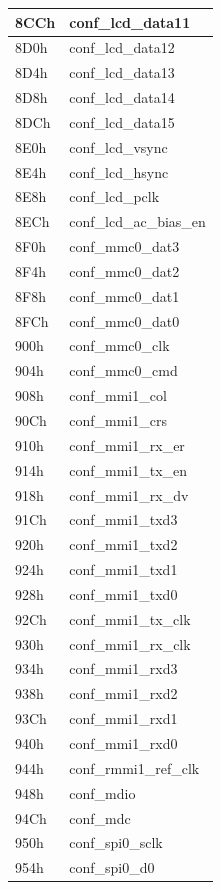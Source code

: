 \begin{longtable}{ | M{7.5cm} | M{7.5cm} |}
	8CCh & conf\_lcd\_data11 \\ \hline
	8D0h & conf\_lcd\_data12 \\ \hline
	8D4h & conf\_lcd\_data13 \\ \hline
	8D8h & conf\_lcd\_data14 \\ \hline
	8DCh & conf\_lcd\_data15 \\ \hline
	8E0h & conf\_lcd\_vsync \\ \hline
	8E4h & conf\_lcd\_hsync \\ \hline
	8E8h & conf\_lcd\_pclk \\ \hline
	8ECh & conf\_lcd\_ac\_bias\_en \\ \hline
	8F0h & conf\_mmc0\_dat3 \\ \hline
	8F4h & conf\_mmc0\_dat2 \\ \hline
	8F8h & conf\_mmc0\_dat1 \\ \hline
	8FCh & conf\_mmc0\_dat0 \\ \hline
	900h & conf\_mmc0\_clk \\ \hline
	904h & conf\_mmc0\_cmd \\ \hline
	908h & conf\_mmi1\_col \\ \hline
	90Ch & conf\_mmi1\_crs \\ \hline
	910h & conf\_mmi1\_rx\_er \\ \hline
	914h & conf\_mmi1\_tx\_en \\ \hline
	918h & conf\_mmi1\_rx\_dv \\ \hline
	91Ch & conf\_mmi1\_txd3 \\ \hline
	920h & conf\_mmi1\_txd2 \\ \hline
	924h & conf\_mmi1\_txd1 \\ \hline
	928h & conf\_mmi1\_txd0 \\ \hline
	92Ch & conf\_mmi1\_tx\_clk \\ \hline
	930h & conf\_mmi1\_rx\_clk \\ \hline
	934h & conf\_mmi1\_rxd3 \\ \hline
	938h & conf\_mmi1\_rxd2 \\ \hline
	93Ch & conf\_mmi1\_rxd1 \\ \hline
	940h & conf\_mmi1\_rxd0 \\ \hline
	944h & conf\_rmmi1\_ref\_clk \\ \hline
	948h & conf\_mdio \\ \hline
	94Ch & conf\_mdc \\ \hline
	950h & conf\_spi0\_sclk \\ \hline
	954h & conf\_spi0\_d0 \\ \hline

\end{longtable}
